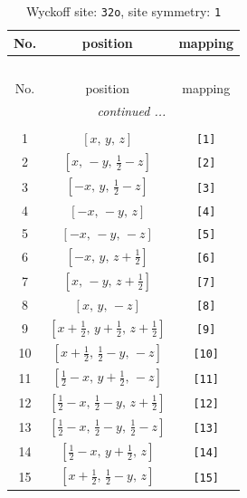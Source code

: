 \documentclass[fleqn,8pt]{jsarticle}
\begin{document}
\renewcommand{\arraystretch}{1.2}
\begin{longtable}{ccc}
\caption{Wyckoff site: {\tt 32o}, site symmetry: {\tt 1}}
 \\
 \hline \hline
No. & position & mapping \\ \hline \endfirsthead

\multicolumn{2}{l}{\tablename\ \thetable{}} \\
 \hline \hline
No. & position & mapping \\ \hline \endhead

 \hline \hline
\multicolumn{2}{r}{\footnotesize\it continued ...} \\ \endfoot

 \hline \hline
\multicolumn{2}{r}{} \\ \endlastfoot

1 & $\left[ x,\, y,\, z \right]$ & {\tt [1]} \\ \hline
2 & $\left[ x,\, - y,\, \frac{1}{2} - z \right]$ & {\tt [2]} \\ \hline
3 & $\left[ - x,\, y,\, \frac{1}{2} - z \right]$ & {\tt [3]} \\ \hline
4 & $\left[ - x,\, - y,\, z \right]$ & {\tt [4]} \\ \hline
5 & $\left[ - x,\, - y,\, - z \right]$ & {\tt [5]} \\ \hline
6 & $\left[ - x,\, y,\, z + \frac{1}{2} \right]$ & {\tt [6]} \\ \hline
7 & $\left[ x,\, - y,\, z + \frac{1}{2} \right]$ & {\tt [7]} \\ \hline
8 & $\left[ x,\, y,\, - z \right]$ & {\tt [8]} \\ \hline
9 & $\left[ x + \frac{1}{2},\, y + \frac{1}{2},\, z + \frac{1}{2} \right]$ & {\tt [9]} \\ \hline
10 & $\left[ x + \frac{1}{2},\, \frac{1}{2} - y,\, - z \right]$ & {\tt [10]} \\ \hline
11 & $\left[ \frac{1}{2} - x,\, y + \frac{1}{2},\, - z \right]$ & {\tt [11]} \\ \hline
12 & $\left[ \frac{1}{2} - x,\, \frac{1}{2} - y,\, z + \frac{1}{2} \right]$ & {\tt [12]} \\ \hline
13 & $\left[ \frac{1}{2} - x,\, \frac{1}{2} - y,\, \frac{1}{2} - z \right]$ & {\tt [13]} \\ \hline
14 & $\left[ \frac{1}{2} - x,\, y + \frac{1}{2},\, z \right]$ & {\tt [14]} \\ \hline
15 & $\left[ x + \frac{1}{2},\, \frac{1}{2} - y,\, z \right]$ & {\tt [15]} \\ \hline

\end{longtable}
\end{document}
